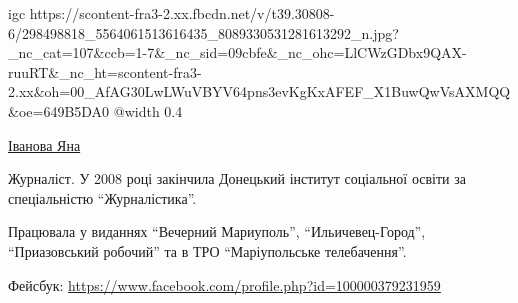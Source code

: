  
 
 
 
 

\ifcmt
  igc https://scontent-fra3-2.xx.fbcdn.net/v/t39.30808-6/298498818_5564061513616435_8089330531281613292_n.jpg?_nc_cat=107&ccb=1-7&_nc_sid=09cbfe&_nc_ohc=LlCWzGDbx9QAX-ruuRT&_nc_ht=scontent-fra3-2.xx&oh=00_AfAG30LwLWuVBYV64pns3evKgKxAFEF_X1BuwQwVsAXMQQ&oe=649B5DA0
	@width 0.4
\fi

\href{https://donbas24.news/author/yana-ivanova}{Іванова Яна}

Журналіст. У 2008 році закінчила Донецький інститут соціальної освіти за
спеціальністю \enquote{Журналістика}.

Працювала у виданнях \enquote{Вечерний Мариуполь}, \enquote{Ильичевец-Город}, \enquote{Приазовський
робочий} та в ТРО \enquote{Маріупольське телебачення}.

Фейсбук: \url{https://www.facebook.com/profile.php?id=100000379231959}
